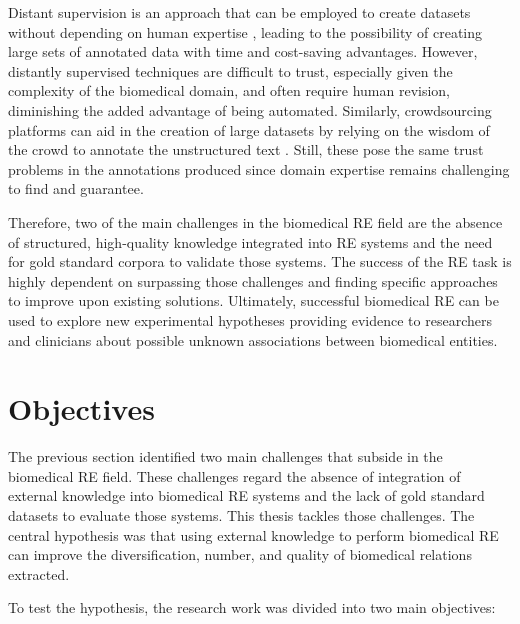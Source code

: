 Distant supervision is an approach that can be employed to create datasets without depending on human expertise \citep{sousa2019silver}, leading to the possibility of creating large sets of annotated data with time and cost-saving advantages. However, distantly supervised techniques are difficult to trust, especially given the complexity of the biomedical domain, and often require human revision, diminishing the added advantage of being automated. Similarly, crowdsourcing platforms can aid in the creation of large datasets by relying on the wisdom of the crowd to annotate the unstructured text \citep{tsueng2020applying}. Still, these pose the same trust problems in the annotations produced since domain expertise remains challenging to find and guarantee. 

Therefore, two of the main challenges in the biomedical RE field are the absence of structured, high-quality knowledge integrated into RE systems and the need for gold standard corpora to validate those systems. The success of the RE task is highly dependent on surpassing those challenges and finding specific approaches to improve upon existing solutions. Ultimately, successful biomedical RE can be used to explore new experimental hypotheses providing evidence to researchers and clinicians about possible unknown associations between biomedical entities.   


\section{Objectives}

The previous section identified two main challenges that subside in the biomedical RE field. These challenges regard the absence of integration of external knowledge into biomedical RE systems and the lack of gold standard datasets to evaluate those systems.
This thesis tackles those challenges. The central hypothesis was that using external knowledge to perform biomedical RE can improve the diversification, number, and quality of biomedical relations extracted. 

To test the hypothesis, the research work was divided into two main objectives:

